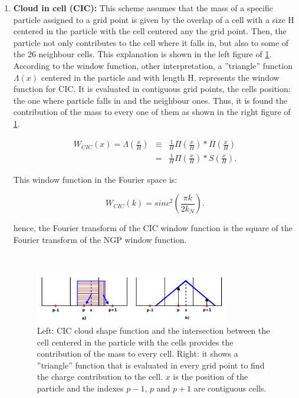 \begin{enumerate}
\item \textbf{ Cloud in cell (CIC): } This scheme assumes that the mass of a specific particle 
assigned to a grid point is given by the overlap of a cell with a size H centered in 
the particle with the cell centered any the grid point. Then, the particle not only 
contributes to the cell where it falls in, but also to some of the 26 neighbour cells. 
This explanation is shown in the left figure of  \ref{CIC}. According to the window 
function, other interpretation, a ''triangle'' function $\Lambda(x)$ centered in the particle and with length H, represents the window function for CIC. 
It is evaluated in contiguous grid points, the cells position: the one where particle falls 
in and the neighbour ones. Thus, it is found the contribution of the mass to every one of them
as shown in the right figure of \ref{CIC}.  

\begin{eqnarray*}
 W_{CIC}(x)  =  \Lambda \left( \frac{x}{H} \right) & \equiv & \frac{1}{H}\Pi\left(\frac{x}{H}\right) *\Pi \left(\frac{x}{H}\right) \\ 
&  = &\frac{1}{H}\Pi\left(\frac{x}{H}\right)*S\left(\frac{x}{H}\right) .
\end{eqnarray*}

This window function in the Fourier space is:

\[ W_{CIC}(k)= sinc^2\left(\frac{\pi k}{2k_N} \right).\]

hence, the Fourier transform of the CIC window function is the square of the Fourier 
transform of the NGP window function. 

\

\begin{figure}[htbp]
       \centering
               \includegraphics[width=0.8\textwidth]{Images/chapter3/CIC.png}
       \caption{\small Left: CIC cloud shape function and the intersection
       between the cell centered in the particle with the cells provides the contribution of
       the mass to every cell. Right: it shows a ''triangle''	 function that is evaluated
       in every grid point to find the charge contribution to the cell. 
      $x$ is the position of the particle and the indexes $p-1$, $p$ and $p+1$ are contiguous cells.}
       \label{CIC}
 \end{figure}


\end{enumerate}
